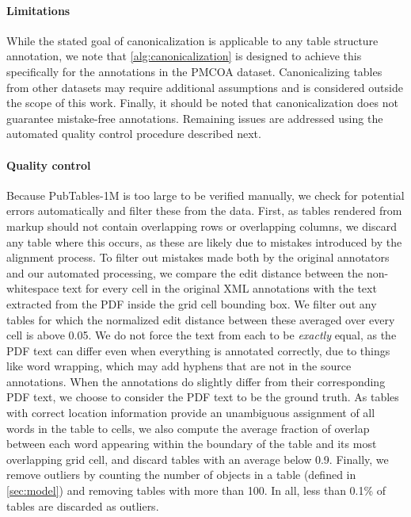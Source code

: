 \documentclass[10pt,twocolumn,letterpaper]{article}
\begin{document}
\paragraph{Limitations} While the stated goal of canonicalization is applicable to any table structure annotation, we note that \cref{alg:canonicalization} is designed to achieve this specifically for the annotations in the PMCOA dataset.
Canonicalizing tables from other datasets may require additional assumptions and is considered outside the scope of this work.
Finally, it should be noted that canonicalization does not guarantee mistake-free annotations.
Remaining issues are addressed using the automated quality control procedure described next.

\paragraph{Quality control}\label{label:quality}
Because PubTables-1M is too large to be verified manually, we check for potential errors automatically and filter these from the data.
First, as tables rendered from markup should not contain overlapping rows or overlapping columns, we discard any table where this occurs, as these are likely due to mistakes introduced by the alignment process.
To filter out mistakes made both by the original annotators and our automated processing, we compare the edit distance between the non-whitespace text for every cell in the original XML annotations with the text extracted from the PDF inside the grid cell bounding box.
We filter out any tables for which the normalized edit distance between these averaged over every cell is above 0.05.
We do not force the text from each to be \textit{exactly} equal, as the PDF text can differ even when everything is annotated correctly, due to things like word wrapping, which may add hyphens that are not in the source annotations.
When the annotations do slightly differ from their corresponding PDF text, we choose to consider the PDF text to be the ground truth.
As tables with correct location information provide an unambiguous assignment of all words in the table to cells, we also compute the average fraction of overlap between each word appearing within the boundary of the table and its most overlapping grid cell, and discard tables with an average below 0.9.
Finally, we remove outliers by counting the number of objects in a table (defined in \cref{sec:model}) and removing tables with more than 100.
In all, less than 0.1\% of tables are discarded as outliers.
\end{document}

